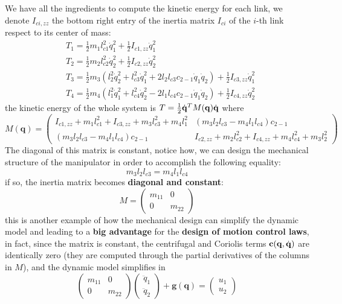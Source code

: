 \documentclass[10pt, a4paper]{report}
\newcommand{\q}{{\mathbf q}}
\begin{document}
We have all the ingredients to compute the kinetic energy for each link, we denote $I_{ci,zz}$ the bottom right entry of the inertia matrix $I_{ci}$ of the $i$-th link respect to its center of mass:\begin{align}
    &T_1=\frac{1}{2}m_1l_{c1}^2\dot q_1^2+\frac{1}{2}I_{c1,zz}\dot q_1^2\\[1.5ex]
    &T_2=\frac{1}{2}m_2l_{c2}^2\dot q_2^2+\frac{1}{2}I_{c2,zz}\dot q_2^2\\[1.5ex]
    &T_3 = \frac{1}{2} m_3 (l_2^2 \dot{q}_2^2 + l_{c3}^2 \dot{q}_1^2 + 2l_2 l_{c3} c_{2-1} \dot{q}_1 \dot{q}_2) + \frac{1}{2} I_{c3,zz} \dot{q}_1^2 \\[1.5ex]
    &T_4 = \frac{1}{2} m_4 (l_1^2 \dot{q}_1^2 + l_{c4}^2 \dot{q}_2^2 - 2l_1 l_{c4} c_{2-1} \dot{q}_1 \dot{q}_2) + \frac{1}{2} I_{c4,zz} \dot{q}_2^2
\end{align}
the kinetic energy of the whole system is $T=\frac{1}{2}\dq^TM(\q)\dq$ where\begin{equation}
    M(\q)=\begin{pmatrix}
I_{c1,zz} + m_1 l_{c1}^2 + I_{c3,zz} + m_3 l_{c3}^2 + m_4 l_1^2 & (m_3 l_2 l_{c3} - m_4 l_1 l_{c4}) c_{2-1}  \\[2ex]
(m_3 l_2 l_{c3} - m_4 l_1 l_{c4}) c_{2-1} & I_{c2,zz} + m_2 l_{c2}^2 + I_{c4,zz} + m_4 l_{c4}^2 + m_3 l_2^2
\end{pmatrix}
\end{equation}
The diagonal of this matrix is constant, notice how, we can design the mechanical structure of the manipulator in order to accomplish the following equality:\begin{equation}
    m_3l_2l_{c3}=m_4l_1l_{c4}
\end{equation}
if so, the inertia matrix becomes \textbf{diagonal and constant}:
\begin{equation}
    M=\begin{pmatrix}
    m_{11} & 0  \\
    0 & m_{22}
    \end{pmatrix}
\end{equation}
this is another example of how the mechanical design can simplify the dynamic model and leading to a \textbf{big advantage} for the \textbf{design of motion control laws}, in fact, since the matrix is constant, the centrifugal and Coriolis terms $\mathbf c(\q,\dq)$ are identically zero (they are computed through the partial derivatives of the columns in $M$), and the dynamic model simplifies in\begin{equation}
    \begin{pmatrix}
    m_{11} & 0  \\
    0 & m_{22}
    \end{pmatrix}
    \begin{pmatrix}
    \ddot q_1\\ 
    \ddot q_2
    \end{pmatrix}
    +\mathbf g(\q)=\begin{pmatrix}
    u_1\\ u_2
    \end{pmatrix}
\end{equation}
\end{document}
